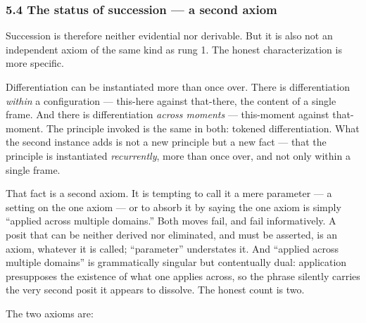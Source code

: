 \documentclass[
]{article}
\begin{document}
\hypertarget{the-status-of-succession-a-second-axiom}{%
\subsubsection{5.4 The status of succession --- a second
axiom}\label{the-status-of-succession-a-second-axiom}}

Succession is therefore neither evidential nor derivable. But it is also
not an independent axiom of the same kind as rung 1. The honest
characterization is more specific.

Differentiation can be instantiated more than once over. There is
differentiation \emph{within} a configuration --- this-here against
that-there, the content of a single frame. And there is differentiation
\emph{across moments} --- this-moment against that-moment. The principle
invoked is the same in both: tokened differentiation. What the second
instance adds is not a new principle but a new fact --- that the
principle is instantiated \emph{recurrently}, more than once over, and
not only within a single frame.

That fact is a second axiom. It is tempting to call it a mere parameter
--- a setting on the one axiom --- or to absorb it by saying the one
axiom is simply ``applied across multiple domains.'' Both moves fail,
and fail informatively. A posit that can be neither derived nor
eliminated, and must be asserted, is an axiom, whatever it is called;
``parameter'' understates it. And ``applied across multiple domains'' is
grammatically singular but contentually dual: application presupposes
the existence of what one applies across, so the phrase silently carries
the very second posit it appears to dissolve. The honest count is two.

The two axioms are:
\end{document}
